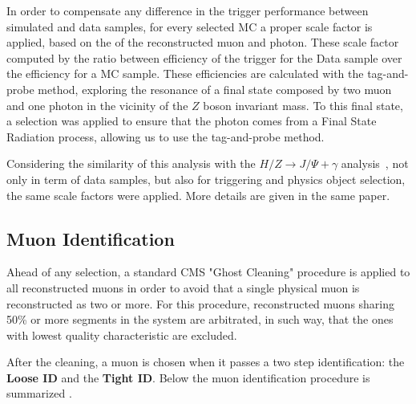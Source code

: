 In order to compensate any difference in the trigger performance between simulated and data samples, for every selected MC a proper scale factor is applied, based on the \PT of the reconstructed muon and photon. These scale factor computed by the ratio between efficiency of the trigger for the Data sample over the efficiency for a MC sample. These efficiencies are calculated with the tag-and-probe method, exploring the resonance of a final state composed by two muon and one photon in the vicinity of the $Z$ boson invariant mass. To this final state, a selection was applied to ensure that the photon comes from a Final State Radiation process, allowing us to use the tag-and-probe method.

Considering the similarity of this analysis with the $H/Z \rightarrow J/\Psi + \gamma$ analysis~\cite{papper_jpsi}, not only in term of data samples, but also for triggering and physics object selection, the same scale factors were applied. More details are given in the same paper.

\subsection{Muon Identification}
\label{sec:muon_id}

Ahead of any selection, a standard CMS "Ghost Cleaning" procedure is applied to all reconstructed muons in order to avoid that a single physical muon is reconstructed as two or more. For this procedure, reconstructed muons sharing 50\% or more segments in the system are arbitrated, in such way, that the ones with lowest quality characteristic are excluded.

After the cleaning, a muon is chosen when it passes a two step identification: the \textbf{Loose ID} and the \textbf{Tight ID}. Below the muon identification procedure is summarized .


